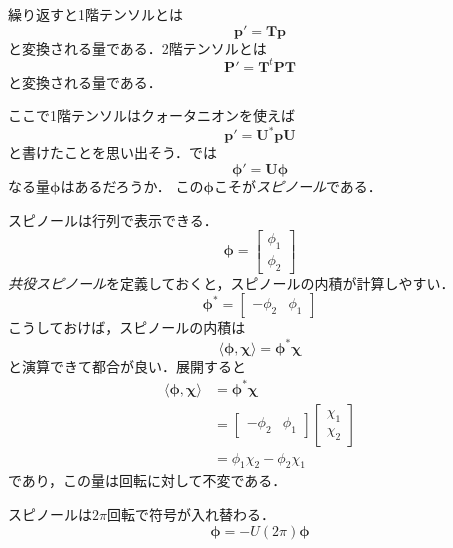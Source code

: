 \documentclass{jsbook}
\newcommand{\keyword}[1]{\emph{#1}}
\newcommand{\bvec}[1]{\boldsymbol{#1}}
\newcommand{\bop}[1]{\boldsymbol{#1}}
\begin{document}
繰り返すと1階テンソルとは
\begin{equation}
\bvec{p}'=\bop{T}\bvec{p}
\end{equation}
と変換される量である．2階テンソルとは
\begin{equation}
\bvec{P}'=\bop{T}^t\bvec{P}\bop{T}
\end{equation}
と変換される量である．

ここで1階テンソルはクォータニオンを使えば
\begin{equation}
\bvec{p}'=\bop{U}^*\bvec{p}\bop{U}
\end{equation}
と書けたことを思い出そう．では
\begin{equation}
\bvec{\phi}'=\bop{U}\bvec{\phi}
\end{equation}
なる量$\bvec{\phi}$はあるだろうか．
この$\bvec{\phi}$こそが\keyword{スピノール}である．

スピノールは行列で表示できる．
\begin{equation}
\bvec{\phi}=\begin{bmatrix}\phi_1\\\phi_2\end{bmatrix}
\end{equation}
\keyword{共役スピノール}を定義しておくと，スピノールの内積が計算しやすい．
\begin{equation}
\bvec{\phi}^*=\begin{bmatrix}-\phi_2&\phi_1\end{bmatrix}
\end{equation}
こうしておけば，スピノールの内積は
\begin{equation}
\langle\bvec{\phi},\bvec{\chi}\rangle=\bvec{\phi}^*\bvec{\chi}
\end{equation}
と演算できて都合が良い．展開すると
\begin{align}
\langle\bvec{\phi},\bvec{\chi}\rangle&=\bvec{\phi}^*\bvec{\chi}\\
  &=\begin{bmatrix}-\phi_2&\phi_1\end{bmatrix}\begin{bmatrix}\chi_1\\\chi_2\end{bmatrix}\\
    &=\phi_1\chi_2-\phi_2\chi_1
\end{align}
であり，この量は回転に対して不変である．

スピノールは$2\pi$回転で符号が入れ替わる．
\begin{equation}
\bvec{\phi}=-U(2\pi)\bvec{\phi}
\end{equation}
\end{document}
